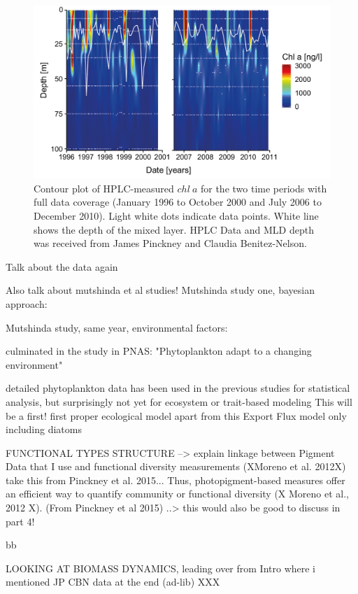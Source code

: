 \begin{figure}
\centering
\includegraphics[trim = 0mm 0mm 0mm 0mm, clip, width=.9\linewidth]{./Chp2-Pre/Pinckneyetal2015_TotChlAcontoursMLD.png}
\caption[Scheme]{\small {Contour plot of HPLC-measured $chl~a$ for the two time periods with full data coverage (January 1996 to October 2000 and July 2006 to December 2010). Light white dots indicate data points. White line shows the depth of the mixed layer. HPLC Data and MLD depth was received from James Pinckney and Claudia Benitez-Nelson.}}
\label{TChlAPinckney}
\end{figure}


Talk about the data again

Also talk about mutshinda et al studies!
Mutshinda study one, bayesian approach: \cite{Mutshinda2013a}

Mutshinda study, same year, environmental factors: \cite{Mutshinda2013}

culminated in the study in PNAS: "Phytoplankton adapt to a changing environment" \cite{Irwin2015}

detailed phytoplankton data has been used in the previous studies for statistical analysis, but surprisingly not yet for ecosystem or trait-based modeling
This will be a first! first proper ecological model apart from this Export Flux model only including diatoms \citep{Walsh2002a}

FUNCTIONAL TYPES STRUCTURE --> explain linkage between Pigment Data that I use and functional diversity measurements (XMoreno et al. 2012X) take this from Pinckney et al. 2015...
Thus, photopigment-based measures offer an efficient way to quantify community or functional diversity (X Moreno et al., 2012 X). (From Pinckney et al 2015) ..> this would also be good to discuss in part 4!

bb


LOOKING AT BIOMASS DYNAMICS, leading over from Intro where i mentioned JP CBN data at the end (ad-lib)
XXX

